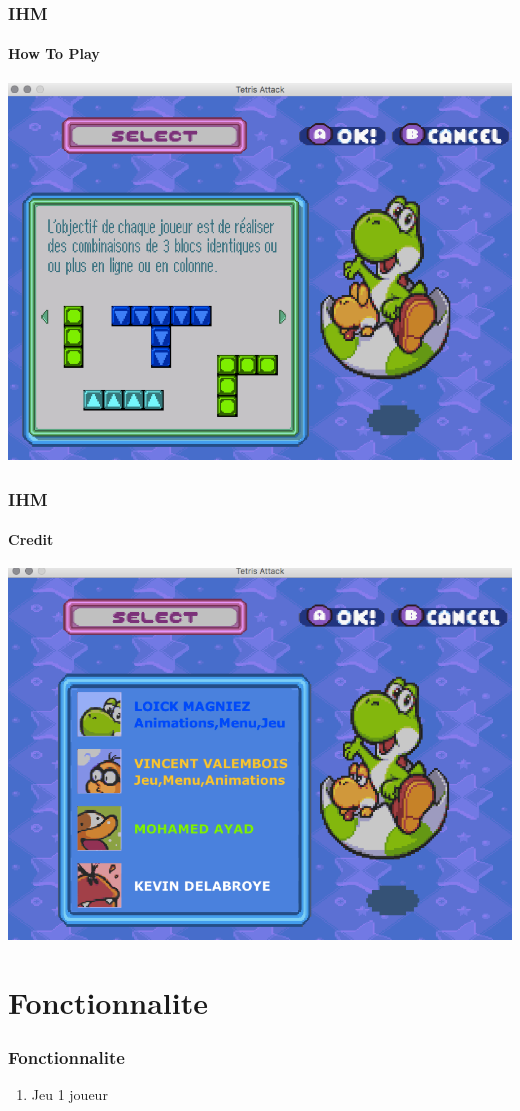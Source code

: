\documentclass{beamer}
\begin{document}
\begin{darkframes}
     \begin{frame}
 	 \frametitle{IHM}
 	 \begin{center}
 	 \framesubtitle{How To Play}
		\includegraphics[scale=0.40]{./Image/howtoplay.png}
		\end{center}
    \end{frame}
    
     \begin{frame}
 	 \frametitle{IHM}
 	 \begin{center}
 	 \framesubtitle{Credit}
		\includegraphics[scale=0.40]{./Image/credit.png}
		\end{center}
    \end{frame}
    
    \section{Fonctionnalite}
 \begin{frame}
 	 \frametitle{Fonctionnalite}
 	   \begin{enumerate}
    \item Jeu 1 joueur 
  \end{enumerate}
    \end{frame}
    

\end{darkframes}
\end{document}
